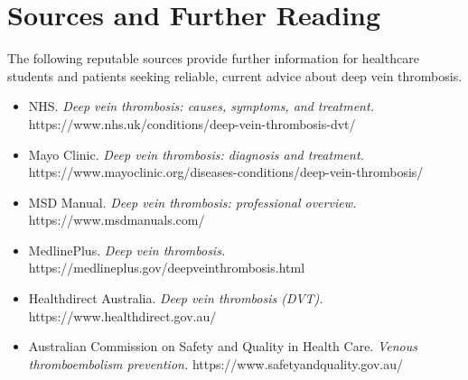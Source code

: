 \section*{Sources and Further Reading}
The following reputable sources provide further information for healthcare students and patients seeking reliable, current advice about deep vein thrombosis.

\begin{itemize}
    \item NHS. \textit{Deep vein thrombosis: causes, symptoms, and treatment.} https://www.nhs.uk/conditions/deep-vein-thrombosis-dvt/
    \item Mayo Clinic. \textit{Deep vein thrombosis: diagnosis and treatment.} https://www.mayoclinic.org/diseases-conditions/deep-vein-thrombosis/
    \item MSD Manual. \textit{Deep vein thrombosis: professional overview.} https://www.msdmanuals.com/
    \item MedlinePlus. \textit{Deep vein thrombosis.} https://medlineplus.gov/deepveinthrombosis.html
    \item Healthdirect Australia. \textit{Deep vein thrombosis (DVT).} https://www.healthdirect.gov.au/
    \item Australian Commission on Safety and Quality in Health Care. \textit{Venous thromboembolism prevention.} https://www.safetyandquality.gov.au/
\end{itemize}
